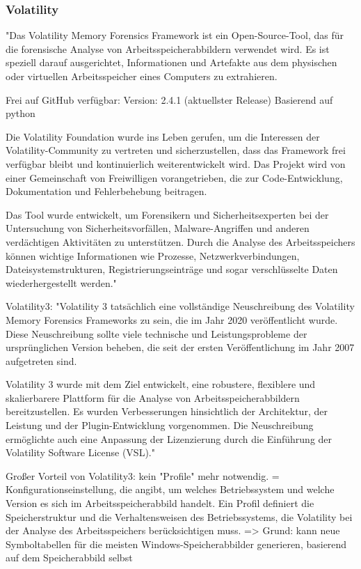 \subsubsection*{Volatility}

	"Das Volatility Memory Forensics Framework ist ein Open-Source-Tool, das für die forensische Analyse von Arbeitsspeicherabbildern verwendet wird. Es ist speziell darauf ausgerichtet, Informationen und Artefakte aus dem physischen oder virtuellen Arbeitsspeicher eines Computers zu extrahieren.
	
	Frei auf GitHub verfügbar: %
	Version: 2.4.1 (aktuellster Release)
	Basierend auf python

	Die Volatility Foundation wurde ins Leben gerufen, um die Interessen der Volatility-Community zu vertreten und sicherzustellen, dass das Framework frei verfügbar 	bleibt und kontinuierlich weiterentwickelt wird. Das Projekt wird von einer Gemeinschaft von Freiwilligen vorangetrieben, die zur Code-Entwicklung, Dokumentation und Fehlerbehebung beitragen.

	Das Tool wurde entwickelt, um Forensikern und Sicherheitsexperten bei der Untersuchung von Sicherheitsvorfällen, Malware-Angriffen und anderen verdächtigen Aktivitäten zu unterstützen. Durch die Analyse des Arbeitsspeichers können wichtige Informationen wie Prozesse, Netzwerkverbindungen, Dateisystemstrukturen, Registrierungseinträge und sogar verschlüsselte Daten wiederhergestellt werden."

	Volatility3:
	"Volatility 3 tatsächlich eine vollständige Neuschreibung des Volatility Memory Forensics Frameworks zu sein, die im Jahr 2020 veröffentlicht wurde. Diese Neuschreibung sollte viele technische und Leistungsprobleme der ursprünglichen Version beheben, die seit der ersten Veröffentlichung im Jahr 2007 aufgetreten sind.

	Volatility 3 wurde mit dem Ziel entwickelt, eine robustere, flexiblere und skalierbarere Plattform für die Analyse von Arbeitsspeicherabbildern bereitzustellen. Es wurden Verbesserungen hinsichtlich der Architektur, der Leistung und der Plugin-Entwicklung vorgenommen. Die Neuschreibung ermöglichte auch eine Anpassung der Lizenzierung durch die Einführung der Volatility Software License (VSL)."

	Großer Vorteil von Volatility3: kein "Profile" mehr notwendig. = Konfigurationseinstellung, die angibt, um welches Betriebssystem und welche Version es sich im Arbeitsspeicherabbild handelt. Ein Profil definiert die Speicherstruktur und die Verhaltensweisen des Betriebssystems, die Volatility bei der Analyse des Arbeitsspeichers berücksichtigen muss.
		=> Grund: kann neue Symboltabellen für die meisten Windows-Speicherabbilder generieren, basierend auf dem Speicherabbild selbst

